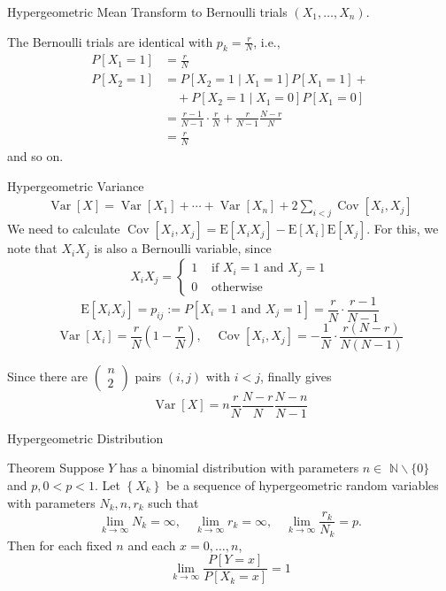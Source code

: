 \documentclass{beamer}
\begin{document}
\begin{frame}{Hypergeometric Mean}
Transform to Bernoulli trials $\left(X_{1}, \ldots, X_{n}\right)$.

The Bernoulli trials are identical with $p_{k}=\frac{r}{N}$, i.e.,
$$
\begin{aligned}
P\left[X_{1}=1\right] &=\frac{r}{N} \\
P\left[X_{2}=1\right] &=P\left[X_{2}=1 \mid X_{1}=1\right] P\left[X_{1}=1\right]+\\
& \quad+P\left[X_{2}=1 \mid X_{1}=0\right] P\left[X_{1}=0\right] \\
&=\frac{r-1}{N-1} \cdot \frac{r}{N}+\frac{r}{N-1} \frac{N-r}{N} \\
&=\frac{r}{N}
\end{aligned}
$$
and so on.

\end{frame}

\begin{frame}{Hypergeometric Variance}
$$\begin{aligned}
\operatorname{Var}[X]=\operatorname{Var}\left[X_{1}\right]+\cdots+\operatorname{Var}\left[X_{n}\right]+2 \sum_{i<j} \operatorname{Cov}\left[X_{i}, X_{j}\right]
\end{aligned}$$
We need to calculate
$
\operatorname{Cov}\left[X_{i}, X_{j}\right]=\mathrm{E}\left[X_{i} X_{j}\right]-\mathrm{E}\left[X_{i}\right] \mathrm{E}\left[X_{j}\right] .
$
For this, we note that $X_{i} X_{j}$ is also a Bernoulli variable, since
$$
X_{i} X_{j}= \begin{cases}1 & \text { if } X_{i}=1 \text { and } X_{j}=1 \\ 0 & \text { otherwise }\end{cases}
$$
$$
\mathrm{E}\left[X_{i} X_{j}\right]=p_{i j}:=P\left[X_{i}=1 \text { and } X_{j}=1\right]=\frac{r}{N} \cdot \frac{r-1}{N-1}$$
$$
\operatorname{Var}\left[X_{i}\right]=\frac{r}{N}\left(1-\frac{r}{N}\right), \quad \operatorname{Cov}\left[X_{i}, X_{j}\right]=-\frac{1}{N} \cdot \frac{r(N-r)}{N(N-1)}
$$

Since there are $(\begin{array}{l}n \\ 2\end{array})$ pairs $(i, j)$ with $i<j$, finally gives
$$
\operatorname{Var}[X]=n \frac{r}{N} \frac{N-r}{N} \frac{N-n}{N-1}
$$
\end{frame}


\begin{frame}{Hypergeometric Distribution}
\begin{block}{Theorem}
Suppose $Y$ has a binomial distribution with parameters $n \in$ $\mathbb{N} \backslash\{0\}$ and $p, 0<p<1$. Let $\left\{X_{k}\right\}$ be a sequence of hypergeometric random variables with parameters $N_{k}, n, r_{k}$ such that
$$
\lim _{k \rightarrow \infty} N_{k}=\infty, \quad \lim _{k \rightarrow \infty} r_{k}=\infty, \quad \lim _{k \rightarrow \infty} \frac{r_{k}}{N_{k}}=p .
$$
Then for each fixed $n$ and each $x=0, \ldots, n$,
$$
\lim _{k \rightarrow \infty} \frac{P[Y=x]}{P\left[X_{k}=x\right]}=1
$$
\end{block}
\end{frame}
\end{document}
